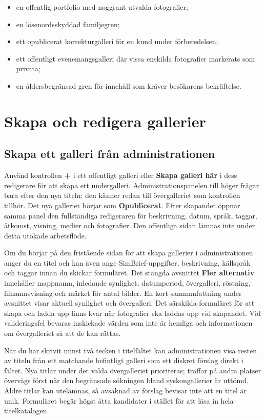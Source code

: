 \documentclass[11pt,a4paper]{article}
\newcommand{\ui}[1]{\textbf{#1}}
\begin{document}
\begin{itemize}
  \item en offentlig portfolio med noggrant utvalda fotografier;
  \item en lösenordsskyddad familjegren;
  \item ett opublicerat korrekturgalleri för en kund under förberedelsen;
  \item ett offentligt evenemangsgalleri där vissa enskilda fotografier
  markerats som privata;
  \item en åldersbegränsad gren för innehåll som kräver besökarens bekräftelse.
\end{itemize}
\section{Skapa och redigera gallerier}
\label{sec:create-edit-gallery}

\subsection{Skapa ett galleri från administrationen}

Använd kontrollen \ui{+} i ett offentligt galleri eller \ui{Skapa galleri här} i
dess redigerare för att skapa ett undergalleri. Administrationspanelen till
höger frågar bara efter den nya titeln; den känner redan till övergalleriet som
kontrollen tillhör. Det nya galleriet börjar som \ui{Opublicerat}. Efter
skapandet öppnar samma panel den fullständiga redigeraren för beskrivning,
datum, språk, taggar, åtkomst, visning, medier och fotografier. Den offentliga
sidan lämnas inte under detta utökade arbetsflöde.

Om du börjar på den fristående sidan för att skapa gallerier i administrationen
anger du en titel och kan även ange SimBrief-uppgifter, beskrivning, källspråk
och taggar innan du skickar formuläret. Det stängda avsnittet \ui{Fler
alternativ} innehåller mappnamn, inledande synlighet, datumperiod, övergalleri,
röstning, filnamnsvisning och märket för antal bilder. En kort sammanfattning
under avsnittet visar aktuell synlighet och övergalleri. Det särskilda
formuläret för att skapa och ladda upp finns kvar när fotografier ska laddas upp
vid skapandet. Vid valideringsfel bevaras inskickade värden som inte är hemliga
och informationen om övergalleriet så att de kan rättas.

När du har skrivit minst två tecken i titelfältet kan administrationen visa
resten av titeln från ett matchande befintligt galleri som ett diskret förslag
direkt i fältet. Nya titlar under det valda övergalleriet prioriteras; träffar
på andra platser övervägs först när den begränsade sökningen bland
syskongallerier är uttömd. Äldre titlar kan utelämnas, så avsaknad av förslag
bevisar inte att en titel är unik. Formuläret begär högst åtta kandidater i
stället för att läsa in hela titelkatalogen.
\end{document}
